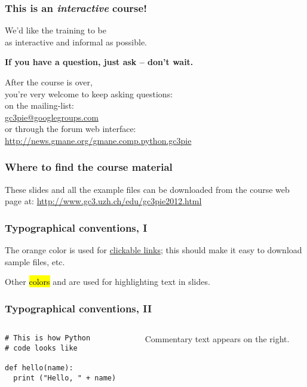 \documentclass[english,serif,mathserif,xcolor=pdftex,dvipsnames,table]{beamer}
\begin{document}
\begin{frame}
  \frametitle{This is an \emph{interactive} course!}
  \begin{center}
    We'd like the training to be \\ as interactive and informal as
    possible.

    \+ \textbf{If you have a question, just ask -- don't wait.}

    \+
    After the course is over, \\ you're very welcome to keep asking questions:
    \\[1ex]
    on the mailing-list: \\
    \href{mailto:gc3pie@googlegroups.com}{gc3pie@googlegroups.com}
    \\[1ex]
    or through the forum web interface: \\ {\small
      \url{http://news.gmane.org/gmane.comp.python.gc3pie}}
  \end{center}
\end{frame}


\begin{frame}
  \frametitle{Where to find the course material}

  These slides and all the example files can be downloaded from the
  course web page at:
  {\small\url{http://www.gc3.uzh.ch/edu/gc3pie2012.html}}

\end{frame}


\begin{frame}
  \frametitle{Typographical conventions, I}

  The orange color is used for
  \href{http://www.gc3.uzh.ch/edu/gc3pie2012.html}{clickable
    links}; this should make it easy to download sample files, etc.

  \+
  Other \hl{colors} and  are used for highlighting
  text in slides.
\end{frame}


\begin{frame}[fragile]
  \frametitle{Typographical conventions, II}

    \begin{columns}[t]
    \begin{column}{0.5\textwidth}
\begin{lstlisting}
# This is how Python
# code looks like

def hello(name):
  print ("Hello, " + name)
\end{lstlisting}
    \end{column}
    \begin{column}{0.5\textwidth}
      \raggedleft Commentary text appears on the right.
    \end{column}
  \end{columns}
\end{frame}
\end{document}
